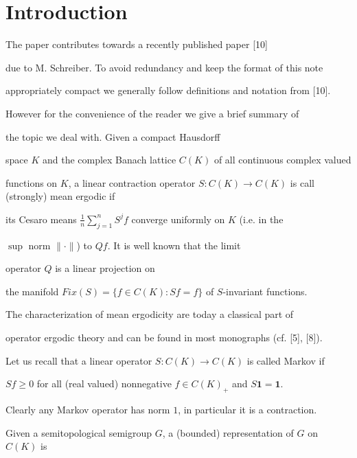 \documentclass{amsart}
\theoremstyle{definition}
\theoremstyle{remark}
\numberwithin{equation}{section}
\begin{document}

\pagestyle{myheadings}








\section{Introduction}

The paper contributes towards  a recently published  paper [10]

due to M. Schreiber. To avoid redundancy and keep the format of this note

appropriately compact we generally follow definitions and notation from [10].

However for the convenience of the reader we give a brief summary of

the topic we deal with. Given a compact Hausdorff

space $K$ and the complex Banach lattice $C(K)$ of all continuous complex valued

functions on $K$, a linear contraction operator $S : C(K) \to C(K)$ is call (strongly) mean ergodic if

its Cesaro means $\frac{1}{n}\sum_{j=1}^n S^jf $ converge uniformly  on $K$ (i.e. in the

$\sup $ norm $\| \cdot \|$)  to $Qf$. It is well known that the limit

operator $Q$ is a linear projection on

the manifold $Fix(S) = \{ f\in C(K) : Sf = f \}$ of $S$-invariant functions.

The characterization of  mean ergodicity are today a classical part of

operator ergodic theory and can be found in most monographs (cf. [5], [8]).



Let us recall that a linear operator $S : C(K) \to C(K)$ is called Markov if

$Sf\geq 0$ for all (real valued) nonnegative  $f\in C(K)_+$ and $S\mathbf{1} = \mathbf{1}$.

Clearly any Markov operator has norm $1$, in particular it is a contraction.

Given a semitopological semigroup $G$, a (bounded) representation of $G$ on $C(K)$ is
\end{document}
